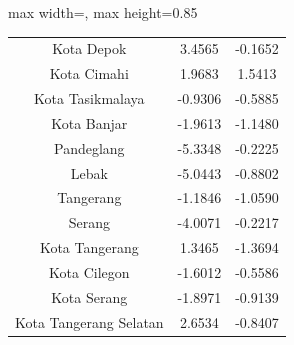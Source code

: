 \begin{table}[H]
\begin{adjustbox}{max width=\textwidth, max height=0.85\textheight}
\begin{tabular}{|c|c|c|}
Kota Depok & 3.4565 & -0.1652 \\
Kota Cimahi & 1.9683 & 1.5413 \\
Kota Tasikmalaya & -0.9306 & -0.5885 \\
Kota Banjar & -1.9613 & -1.1480 \\
Pandeglang & -5.3348 & -0.2225 \\
Lebak & -5.0443 & -0.8802 \\
Tangerang & -1.1846 & -1.0590 \\
Serang & -4.0071 & -0.2217 \\
Kota Tangerang & 1.3465 & -1.3694 \\
Kota Cilegon & -1.6012 & -0.5586 \\
Kota Serang & -1.8971 & -0.9139 \\
Kota Tangerang Selatan & 2.6534 & -0.8407 \\
\hline
\end{tabular}
\end{adjustbox}
\end{table}